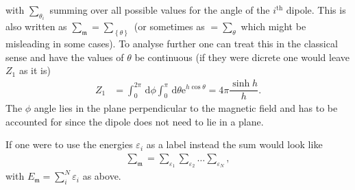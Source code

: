 \documentclass[a4paper,10pt]{article}
\newcommand{\td}{\,\text{d}}
\numberwithin{equation}{section}
\begin{document}
\begin{multicols}{2}
with $\sum_{\theta _i}^{}$ summing over all possible values for the angle of the $i^{\text{th}}$ dipole.
This is also written as $\sum_{\mathfrak{m}}^{}=\sum_{ \left\{\theta \right\}}^{}$ (or sometimes as $=\sum_{\theta }^{}$ which might be misleading in some cases).
To analyse further one can treat this in the classical sense and have the values of $\theta $ be continuous (if they were dicrete one would leave $Z_1$ as it is)
\begin{align} 
  Z_1 &= \int_{0}^{2\pi }\td \phi \int_{0}^{\pi }\td \theta \text{e}^{h\cos \theta }=4\pi \dfrac{\sinh h}{h}
.\end{align}
The $\phi $ angle lies in the plane perpendicular to the magnetic field and has to be accounted for since the dipole does not need to lie in a plane.

If one were to use the energies $\varepsilon _i$ as a label instead the sum would look like
\begin{align} 
  \sum_{\mathfrak{m}}^{}=\sum_{\varepsilon _1}^{}\sum_{\varepsilon _2}^{}\hdots \sum_{\varepsilon _N}^{}
,\end{align} 
with $E_\mathfrak{m}=\sum_{i}^{N}\varepsilon _i$ as above.


\end{multicols}
\end{document}
